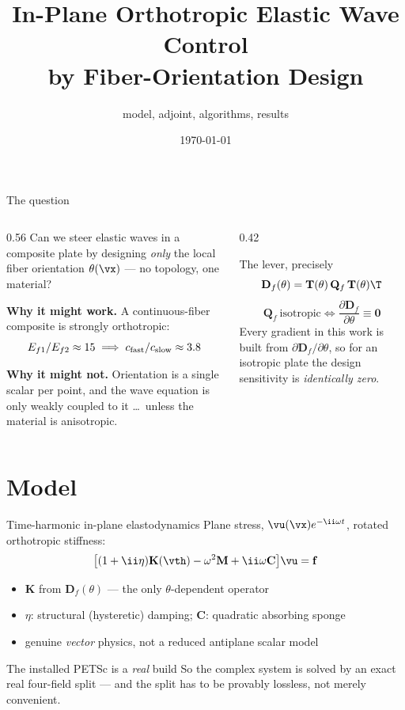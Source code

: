 \documentclass[aspectratio=169,10pt]{beamer}
\title{In-Plane Orthotropic Elastic Wave Control\\by Fiber-Orientation Design}
\subtitle{model, adjoint, algorithms, results}
\date{\today}
\author{}
\begin{document}
\maketitle

\begin{frame}{The question}
\begin{columns}[T]
\begin{column}{0.56\textwidth}
Can we steer elastic waves in a composite plate by designing \emph{only} the
local fiber orientation $\theta(\vx)$ --- no topology, one material?
\medskip

\textbf{Why it might work.} A continuous-fiber composite is strongly orthotropic:
\[
  E_{f1}/E_{f2}\approx 15 \;\Longrightarrow\; c_{\rm fast}/c_{\rm slow}\approx 3.8
\]
\medskip

\textbf{Why it might not.} Orientation is a single scalar per point, and the wave
equation is only weakly coupled to it \dots\ unless the material is anisotropic.
\end{column}
\begin{column}{0.42\textwidth}
\begin{block}{The lever, precisely}
\[
  \mathbf D_f(\theta)=\mathbf T(\theta)\,\mathbf Q_f\,\mathbf T(\theta)\T
\]
\[
  \mathbf Q_f\ \text{isotropic}\iff
  \frac{\partial\mathbf D_f}{\partial\theta}\equiv\bm 0
\]
Every gradient in this work is built from
$\partial\mathbf D_f/\partial\theta$, so for an isotropic plate the design
sensitivity is \emph{identically zero}.
\end{block}
\end{column}
\end{columns}
\end{frame}

\section{Model}

\begin{frame}{Time-harmonic in-plane elastodynamics}
Plane stress, $\vu(\vx)e^{-\ii\omega t}$, rotated orthotropic stiffness:
\[
  \bigl[(1+\ii\eta)\mathbf K(\vth)-\omega^2\mathbf M+\ii\omega\mathbf C\bigr]\vu=\mathbf f
\]
\begin{itemize}
  \item $\mathbf K$ from $\mathbf D_f(\theta)$ --- the only $\theta$-dependent operator
  \item $\eta$: structural (hysteretic) damping; $\mathbf C$: quadratic absorbing sponge
  \item genuine \emph{vector} physics, not a reduced antiplane scalar model
\end{itemize}
\vfill
\begin{alertblock}{The installed PETSc is a \emph{real} build}
So the complex system is solved by an exact real four-field split --- and the
split has to be provably lossless, not merely convenient.
\end{alertblock}
\end{frame}
\end{document}
